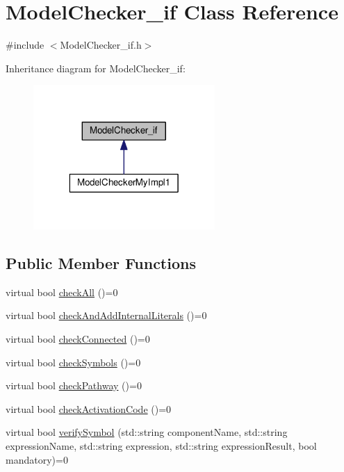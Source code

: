 \hypertarget{class_model_checker__if}{\section{Model\-Checker\-\_\-if Class Reference}
\label{class_model_checker__if}
}


{\ttfamily \#include $<$Model\-Checker\-\_\-if.\-h$>$}



Inheritance diagram for Model\-Checker\-\_\-if\-:\nopagebreak
\begin{figure}[H]
\begin{center}
\leavevmode
\includegraphics[width=196pt]{class_model_checker__if__inherit__graph}
\end{center}
\end{figure}
\subsection*{Public Member Functions}
\begin{DoxyCompactItemize}
\item 
virtual bool \hyperlink{class_model_checker__if_a83bc988696c49a17e0e7668e24743251}{check\-All} ()=0
\item 
virtual bool \hyperlink{class_model_checker__if_a22989b69e688a96fd200e740d33181a5}{check\-And\-Add\-Internal\-Literals} ()=0
\item 
virtual bool \hyperlink{class_model_checker__if_a0d527f054d705b5527bb6521e51c34a7}{check\-Connected} ()=0
\item 
virtual bool \hyperlink{class_model_checker__if_a92ab650708e675a1818b41fe4eb93a59}{check\-Symbols} ()=0
\item 
virtual bool \hyperlink{class_model_checker__if_a1d1e71dcfd02500cf2a844a62395ac36}{check\-Pathway} ()=0
\item 
virtual bool \hyperlink{class_model_checker__if_af5be5d01ea1c549eee6b94907f5ccb74}{check\-Activation\-Code} ()=0
\item 
virtual bool \hyperlink{class_model_checker__if_a36eada12fe9753f5c89099c572e27426}{verify\-Symbol} (std\-::string component\-Name, std\-::string expression\-Name, std\-::string expression, std\-::string expression\-Result, bool mandatory)=0
\end{DoxyCompactItemize}


